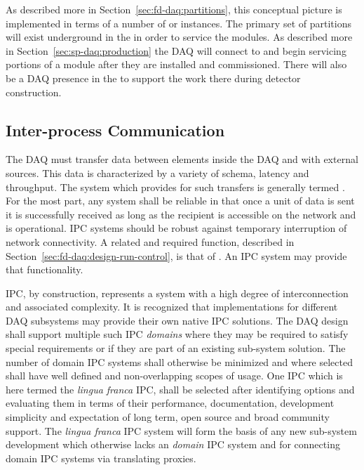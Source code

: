 As described more in Section~\ref{sec:fd-daq:partitions}, this conceptual picture is implemented in terms of a number of  or instances. 
The primary set of partitions will exist underground in the  in order to service the  modules. 
As described more in Section~\ref{sec:sp-daq:production} the DAQ will connect to and begin servicing portions of a  module after they are installed and commissioned. 
There will also be a DAQ presence in the  to support the work there during detector construction.




  



\subsection{Inter-process Communication}
\label{sec:fd-daq:design-messages}

The DAQ must transfer data between elements inside the DAQ and with external sources. 
This data is characterized by a variety of schema, latency and throughput. 
The system which provides for such transfers is generally termed .
For the most part, any  system shall be reliable in that once a unit of data is sent it is successfully received as long as the recipient is accessible on the network and is operational. 
IPC systems should be robust against temporary interruption of network connectivity. 
A related and required function, described in Section~\ref{sec:fd-daq:design-run-control}, is that of . 
An IPC system may provide that functionality.

IPC, by construction, represents a system with a high degree of interconnection and associated complexity. 
It is recognized that implementations for different DAQ subsystems may provide their own native IPC solutions. 
The DAQ design shall support multiple such IPC \textit{domains} where they may be required to satisfy special requirements or if they are part of an existing sub-system solution. 
The number of domain IPC systems shall otherwise be minimized and where selected shall have well defined and non-overlapping scopes of usage. 
One IPC which is here termed the \textit{lingua franca} IPC, shall be selected after identifying options and evaluating them in terms of their performance, documentation, development simplicity and expectation of long term, open source and broad community support. 
The \textit{lingua franca} IPC system will form the basis of any new sub-system development which otherwise lacks an \textit{domain} IPC system and for connecting domain IPC systems via translating proxies.

